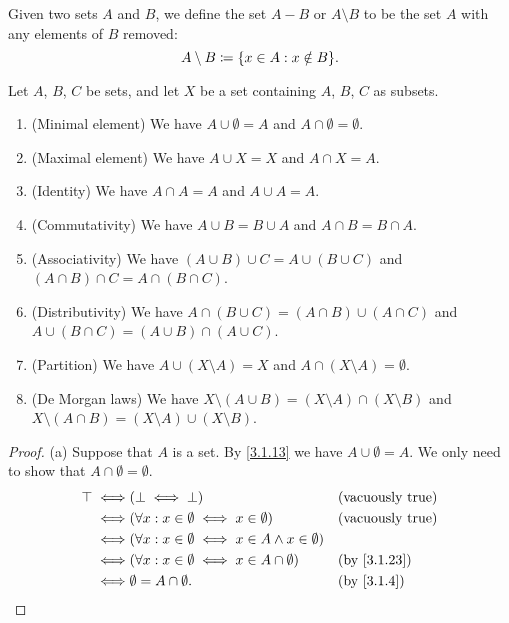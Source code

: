 \setcounter{thm}{26}
\begin{defn}\label{3.1.27}
	Given two sets \(A\) and \(B\), we define the set \(A - B\) or \(A \setminus B\) to be the set \(A\) with any elements of \(B\) removed:
	\[
		A \setminus B \coloneqq \set{x \in A : x \notin B}.
	\]
\end{defn}

\begin{prop}\label{3.1.28}
	Let \(A\), \(B\), \(C\) be sets, and let \(X\) be a set containing \(A\), \(B\), \(C\) as subsets.
	\begin{enumerate}
		\item (Minimal element) We have \(A \cup \emptyset = A\) and \(A \cap \emptyset = \emptyset\).
		\item (Maximal element) We have \(A \cup X = X\) and \(A \cap X = A\).
		\item (Identity) We have \(A \cap A = A\) and \(A \cup A = A\).
		\item (Commutativity) We have \(A \cup B = B \cup A\) and \(A \cap B = B \cap A\).
		\item (Associativity) We have \((A \cup B) \cup C = A \cup (B \cup C)\) and \((A \cap B) \cap C = A \cap (B \cap C)\).
		\item (Distributivity) We have \(A \cap (B \cup C) = (A \cap B) \cup (A \cap C)\) and \(A \cup (B \cap C) = (A \cup B) \cap (A \cup C)\).
		\item (Partition) We have \(A \cup (X \setminus A) = X\) and \(A \cap (X \setminus A) = \emptyset\).
		\item (De Morgan laws) We have \(X \setminus (A \cup B) = (X \setminus A) \cap (X \setminus B)\) and \(X \setminus (A \cap B) = (X \setminus A) \cup (X \setminus B)\).
	\end{enumerate}
\end{prop}

\begin{proof}{(a)}
	Suppose that \(A\) is a set.
	By \cref{3.1.13} we have \(A \cup \emptyset = A\).
	We only need to show that \(A \cap \emptyset = \emptyset\).
	\begin{align*}
		\top \iff & (\bot \iff \bot)                                                 &  & \text{(vacuously true)} \\
		\iff      & (\forall x : x \in \emptyset \iff x \in \emptyset)               &  & \text{(vacuously true)} \\
		\iff      & (\forall x : x \in \emptyset \iff x \in A \land x \in \emptyset)                              \\
		\iff      & (\forall x : x \in \emptyset \iff x \in A \cap \emptyset)        &  & \by{3.1.23}             \\
		\iff      & \emptyset = A \cap \emptyset.                                    &  & \by{3.1.4}
	\end{align*}
\end{proof}

